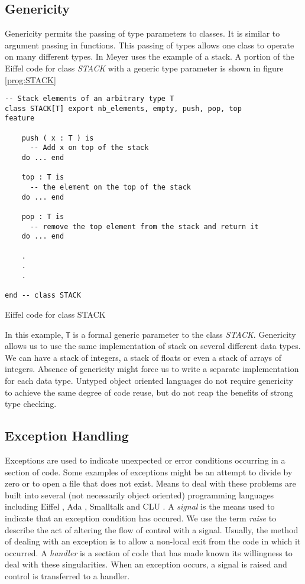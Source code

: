 \subsection{Genericity}

Genericity permits the passing of type parameters to classes.  It is
similar to argument passing in functions.  This passing of types
allows one class to operate on many different types.  In
\cite{Meyer88} Meyer uses the example of a stack.  A portion of the
Eiffel code for class {\em STACK} with a generic type parameter is
shown in figure \ref{prog:STACK}

\begin{shortfigure}
\begin{verbatim}
-- Stack elements of an arbitrary type T
class STACK[T] export nb_elements, empty, push, pop, top
feature

    push ( x : T ) is
      -- Add x on top of the stack
    do ... end

    top : T is
      -- the element on the top of the stack
    do ... end

    pop : T is
      -- remove the top element from the stack and return it
    do ... end

    .
    .
    .

end -- class STACK
\end{verbatim}
\caption{Eiffel code for class STACK}
\label{prog:STACK}
\end{shortfigure}

In this example, {\tt T} is a formal generic parameter to the class {\em
STACK}.  Genericity allows us to use the same implementation of stack
on several different data types.  We can have a stack of integers, a
stack of floats or even a stack of arrays of integers.  Absence of
genericity might force us to write a separate implementation for each
data type.  Untyped object oriented languages do not require
genericity to achieve the same degree of code reuse, but do not reap
the benefits of strong type checking.


\subsection{Exception Handling}
\label{sec:except}

Exceptions are used to indicate unexpected or error conditions
occurring in a section of code.  Some examples of exceptions might be
an attempt to divide by zero or to open a file that does not exist.
Means to deal with these problems are built into several (not
necessarily object oriented) programming languages including Eiffel
\cite{Meyer88}, Ada \cite{Booch83}, Smalltalk \cite{Goldberg83} and
CLU \cite{Liskov81}.  A {\em signal} is the means used to indicate
that an exception condition has occured.  We use the term {\em raise}
to describe the act of altering the flow of control with a signal.
Usually, the method of dealing with an exception is to allow a
non-local exit from the code in which it occurred.  A {\em handler} is
a section of code that has made known its willingness to deal with
these singularities.  When an exception occurs, a signal is raised
and control is transferred to a handler.

